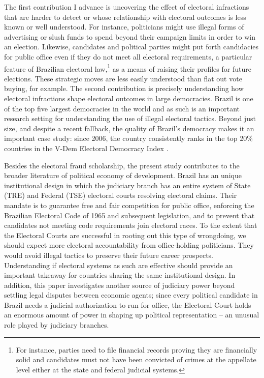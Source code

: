 \documentclass[11pt]{article}
\begin{document}
The first contribution I advance is uncovering the effect of electoral infractions that are harder to detect or whose relationship with electoral outcomes is less known or well understood. For instance, politicians might use illegal forms of advertising or slush funds to spend beyond their campaign limits in order to win an election. Likewise, candidates and political parties might put forth candidacies for public office even if they do not meet all electoral requirements, a particular feature of Brazilian electoral law,\footnote{For instance, parties need to file financial records proving they are financially solid and candidates must not have been convicted of crimes at the appellate level either at the state and federal judicial systems.} as a means of raising their profiles for future elections. These strategic moves are less easily understood than flat out vote buying, for example. The second contribution is precisely understanding how electoral infractions shape electoral outcomes in large democracies. Brazil is one of the top five largest democracies in the world and as such is an important research setting for understanding the use of illegal electoral tactics. Beyond just size, and despite a recent fallback, the quality of Brazil's democracy makes it an important case study: since 2006, the country consistently ranks in the top 20\% countries in the V-Dem Electoral Democracy Index \citep{CoppedgeVDemCountryYearDataset2018}.

Besides the electoral fraud scholarship, the present study contributes to the broader literature of political economy of development. Brazil has an unique institutional design in which the judiciary branch has an entire system of State (TRE) and Federal (TSE) electoral courts resolving electoral claims. Their mandate is to guarantee free and fair competition for public office, enforcing the Brazilian Electoral Code of 1965 and subsequent legislation, and to prevent that candidates not meeting code requirements join electoral races. To the extent that the Electoral Courts are successful in rooting out this type of wrongdoing, we should expect more electoral accountability from office-holding politicians. They would avoid illegal tactics to preserve their future career prospects. Understanding if electoral systems as such are effective should provide an important takeaway for countries sharing the same institutional design. In addition, this paper investigates another source of judiciary power beyond settling legal disputes between economic agents; since every political candidate in Brazil needs a judicial authorization to run for office, the Electoral Court holds an enormous amount of power in shaping up political representation -- an unusual role played by judiciary branches.
\end{document}

